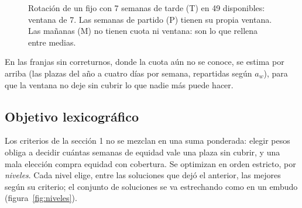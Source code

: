 \documentclass[11pt,a4paper]{article}
\begin{document}
\begin{figure}[ht]
\centering
{}
\caption{Rotación de un fijo con 7 semanas de tarde (T) en 49 disponibles: ventana de 7. Las
semanas de partido (P) tienen su propia ventana. Las mañanas (M) no tienen cuota ni ventana: son
lo que rellena entre medias.}
\label{fig:rotacion}
\end{figure}

En las franjas sin correturnos, donde la cuota aún no se conoce, se estima por arriba (las plazas
del año a cuatro días por semana, repartidas según $a_w$), para que la ventana no deje sin cubrir
lo que nadie más puede hacer.

\subsection{Objetivo lexicográfico}

Los criterios de la sección 1 no se mezclan en una suma ponderada: elegir pesos obliga a decidir
cuántas semanas de equidad vale una plaza sin cubrir, y una mala elección compra equidad con
cobertura. Se optimizan en orden estricto, por \emph{niveles}. Cada nivel elige, entre las
soluciones que dejó el anterior, las mejores según su criterio; el conjunto de soluciones se va
estrechando como en un embudo (figura~\ref{fig:niveles}).
\end{document}
